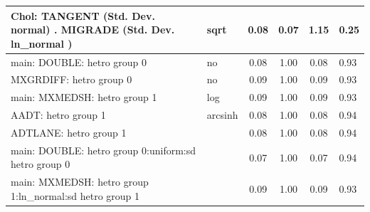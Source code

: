 \begin{table}
\begin{center}
\begin{tabular}{|l|l|c|c|c|l|}
			\hline
			 Chol: TANGENT (Std. Dev. normal) . MIGRADE (Std. Dev.   ln_normal ) & sqrt & 0.08 & 0.07 & 1.15 & 0.25 \\
			\hline
			main: DOUBLE: hetro group 0 & no & 0.08 & 1.00 & 0.08 & 0.93 \\
			\hline
			MXGRDIFF: hetro group 0 & no & 0.09 & 1.00 & 0.09 & 0.93 \\
			\hline
			main: MXMEDSH: hetro group 1 & log & 0.09 & 1.00 & 0.09 & 0.93 \\
			\hline
			AADT: hetro group 1 & arcsinh & 0.08 & 1.00 & 0.08 & 0.94 \\
			\hline
			ADTLANE: hetro group 1 &  & 0.08 & 1.00 & 0.08 & 0.94 \\
			\hline
			main: DOUBLE: hetro group 0:uniform:sd  hetro group 0 &  & 0.07 & 1.00 & 0.07 & 0.94 \\
			\hline
			main: MXMEDSH: hetro group 1:ln_normal:sd  hetro group 1 &  & 0.09 & 1.00 & 0.09 & 0.93 \\
			\hline
		\end{tabular}
	\end{center}
\end{table}